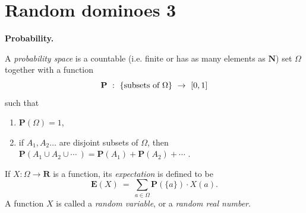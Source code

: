 \documentclass[11pt,fleqn]{book} %
\begin{document}





















\newpage 
 \chapter{Random dominoes 3}




\setcounter{problem}{0}

\textbf{Probability.}

\begin{definition}
  A \textit{probability space} is a countable (i.e. finite or has as many elements as $\textbf{N}$) set $\Omega$ together with a function 
  $$\mathbf{P}\ : \ \{\textup{subsets of }\Omega\} \ \to \ [0,1]$$
  such that 
  \begin{enumerate}
   \item $\mathbf{P}(\Omega)=1$, 
   \item if $A_1, A_2 \ldots$ are disjoint subsets of $\Omega$, then $\mathbf{P}(A_1 \cup A_2 \cup \cdots \ ) = \mathbf{P}(A_1)+\mathbf{P}(A_2)+\cdots$ .
  \end{enumerate}
If $X:\Omega \to \mathbf{R}$ is a function, its \textit{expectation} is defined to be 
$$\mathbf{E}(X) \ = \ \sum_{a\in \Omega} \mathbf{P}(\{a\})\cdot X(a).$$
A function $X$ is called a \textit{random variable}, or a \textit{random real number}.
\end{definition}
\end{document}
